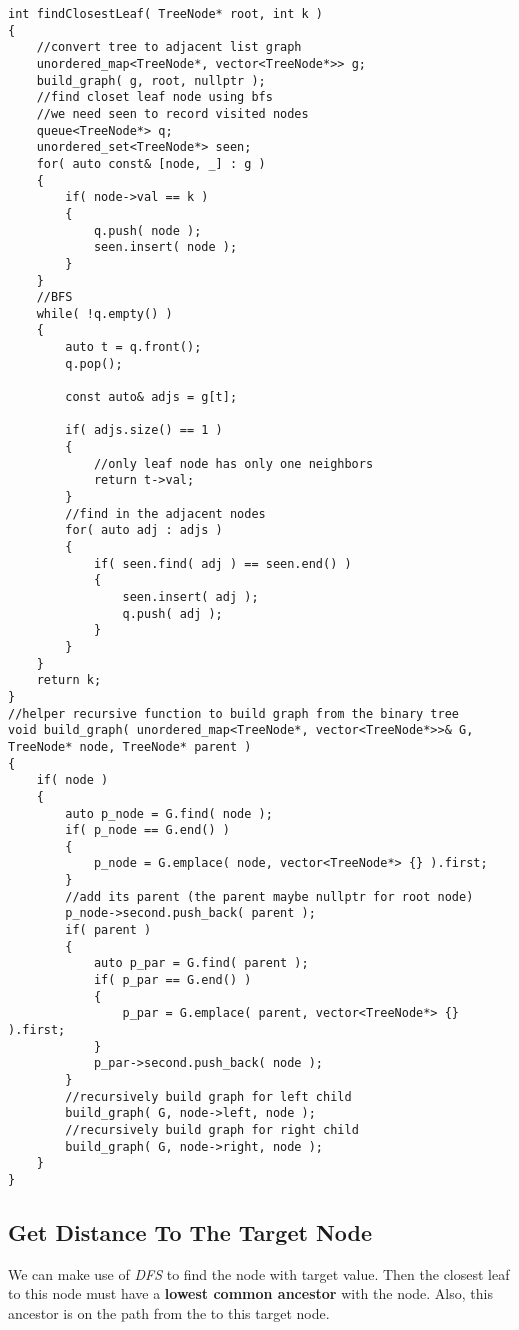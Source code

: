 \setcounter{lstlisting}{0}
\begin{lstlisting}[style=customc, caption={BFS On Graph Representation Of Binary Tree}]
int findClosestLeaf( TreeNode* root, int k )
{
    //convert tree to adjacent list graph
    unordered_map<TreeNode*, vector<TreeNode*>> g;
    build_graph( g, root, nullptr );
    //find closet leaf node using bfs
    //we need seen to record visited nodes
    queue<TreeNode*> q;
    unordered_set<TreeNode*> seen;
    for( auto const& [node, _] : g )
    {
        if( node->val == k )
        {
            q.push( node );
            seen.insert( node );
        }
    }
    //BFS
    while( !q.empty() )
    {
        auto t = q.front();
        q.pop();

        const auto& adjs = g[t];

        if( adjs.size() == 1 )
        {
            //only leaf node has only one neighbors
            return t->val;
        }
        //find in the adjacent nodes
        for( auto adj : adjs )
        {
            if( seen.find( adj ) == seen.end() )
            {
                seen.insert( adj );
                q.push( adj );
            }
        }
    }
    return k;
}
//helper recursive function to build graph from the binary tree
void build_graph( unordered_map<TreeNode*, vector<TreeNode*>>& G, TreeNode* node, TreeNode* parent )
{
    if( node )
    {
        auto p_node = G.find( node );
        if( p_node == G.end() )
        {
            p_node = G.emplace( node, vector<TreeNode*> {} ).first;
        }
        //add its parent (the parent maybe nullptr for root node)
        p_node->second.push_back( parent );
        if( parent )
        {
            auto p_par = G.find( parent );
            if( p_par == G.end() )
            {
                p_par = G.emplace( parent, vector<TreeNode*> {} ).first;
            }
            p_par->second.push_back( node );
        }
        //recursively build graph for left child
        build_graph( G, node->left, node );
        //recursively build graph for right child
        build_graph( G, node->right, node );
    }
}
\end{lstlisting}

\subsection{Get Distance To The Target Node}
We can make use of \textit{DFS} to find the node with target value. Then the closest leaf to this node must have a \textbf{lowest common ancestor} with the node. Also, this ancestor is on the path from the  to this target node. 

